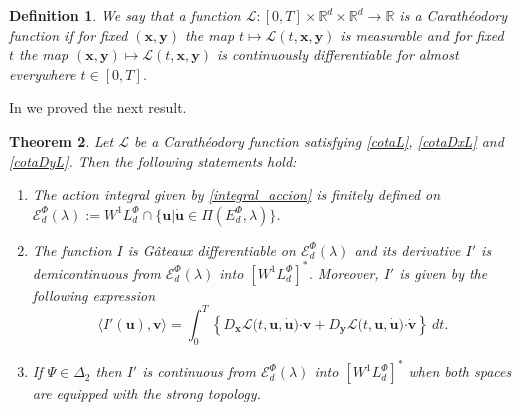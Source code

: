 \documentclass[twoside]{article}
\newtheorem{thm}{Theorem}[section]
\newtheorem{defi}[thm]{Definition}
\theoremstyle{remark}
\newcommand{\lphi}{L^{\Phi}}
\newcommand{\ephi}{E^{\Phi}}
\newcommand{\wphi}{W^{1}\lphi}
\newcommand{\domi}{\mathcal{E}^{\Phi}_d(\lambda)}
\renewcommand{\b}[1]{\boldsymbol{#1}}
\newcommand{\ccdot}{\b{\cdot}}
\begin{document}


\begin{defi} We say that a function $\mathcal{L}:[0,T]\times \mathbb{R}^d \times \mathbb{R}^d \rightarrow \mathbb{R}$ is a Carath\'eodory function if for fixed $(\b{x},\b{y})$
the map $t \mapsto \mathcal{L}(t, \b{x},\b{y})$ is measurable  and for fixed $t$ the map  $(\b{x},\b{y}) \mapsto \mathcal{L}(t, \b{x}, \b{y})$ is continuously differentiable for almost everywhere $t\in [0,T]$.
\end{defi}

In \cite{ABGMS2015} we proved the next result.

\begin{thm}\label{teorema_acotacion}
Let $\mathcal{L}$ be a Carath\'eodory function satisfying \eqref{cotaL}, \eqref{cotaDxL} and \eqref{cotaDyL}. 
Then the following statements hold:
\begin{enumerate}
\item \label{T1item1} \label{A1} The action integral given by \eqref{integral_accion}
is finitely defined on $\domi:=W^{1}\lphi_d\cap\{\b{u}|\b{\dot{u}}\in\Pi(\ephi_d,\lambda)\}$.

\item\label{T1item3} The function  $I$ is G\^ateaux differentiable on $\domi$ and  its derivative $I'$ is demicontinuous from $\domi$  into $\left[\wphi_d \right]^*$. Moreover, $I'$ is given by the following expression
\begin{equation}\label{DerAccion}
\langle  I'(\b{u}),\b{v}\rangle= \int_0^T \left\{D_{\b{x}}\mathcal{L}\big(t,\b{u},\b{\dot{u}}\big)\ccdot \b{v}+ D_{\b{y}}\mathcal{L}\big(t,\b{u},\b{\dot{u}}\big)\ccdot\b{\dot{v}}\right\} \ dt.
\end{equation}

\item\label{T1item4}  If  $\Psi \in \Delta_2$ then 
  $I'$ is continuous from $\domi$ into $\left[\wphi_d\right]^*$ when both spaces are equipped with the strong topology.
\end{enumerate}
\end{thm}
\end{document}
